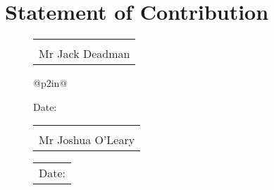 \documentclass{article}
\makeatletter
\newcommand{\sign}[1]{%
  \begin{tabular}[t]{@{}l@{}}
  \makebox[2in]{\dotfill}\\
  \strut#1\strut
  \end{tabular}%
}
\newcommand{\Date}{%
  \begin{tabular}[t]{@{}p{2in}@{}}
  \\[-2ex]
  \strut Date: \dotfill\strut
  \end{tabular}%
}
\makeatother
\begin{document}
\section*{Statement of Contribution}

\lipsum[1]

\begin{figure}[h]
	\begin{minipage}[c]{0.4\linewidth}
    		\sign{Mr Jack Deadman}
    		\Date
	\end{minipage}	
\end{figure}
	

\lipsum[5]
\begin{figure}[h]
	\begin{minipage}[c]{0.4\linewidth}
		\sign{Mr Joshua O'Leary}
		\Date
	\end{minipage}	
\end{figure}
\end{document}
